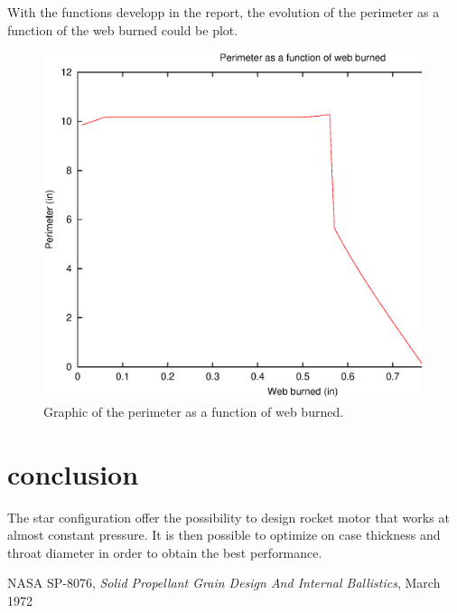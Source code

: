 \documentclass[11pt, titlepage]{article}
\begin{document}
  With the functions developp in the report, the evolution of the
  perimeter as a function of the web burned could be plot.

\begin{figure}
 \begin{center}
 \includegraphics[height=4in]{img/perimeter.ps}
      \caption{Graphic of the perimeter as a function of web burned.}\label{grah}
 \end{center}
\end{figure}


\section{conclusion}

The star configuration offer the possibility to design rocket motor
that works at almost constant pressure. It is then possible to
optimize on case thickness and throat diameter in order to obtain the best
performance.

\begin{thebibliography}{}
 NASA SP-8076, {\em Solid Propellant Grain Design And
Internal Ballistics}, March 1972
\end{thebibliography}
\end{document}
